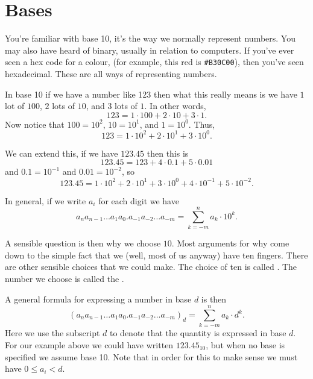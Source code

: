 \documentclass[fleqn]{LectureClass/LectureClass}
\begin{document}
    \section{Bases}
    You're familiar with base 10, it's the way we normally represent numbers.
    You may also have heard of binary, usually in relation to computers.
    If you've ever seen a hex code for a colour, (for example, \textcolor{glasgowPillarbox}{this red is \texttt{\#B30C00}}), then you've seen hexadecimal.
    These are all ways of representing numbers.
    
    In base 10 if we have a number like 123 then what this really means is we have \(1\) lot of \(100\), \(2\) lots of \(10\), and \(3\) lots of \(1\).
    In other words,
    \begin{equation}
        123 = 1 \cdot 100 + 2 \cdot 10 + 3 \cdot 1.
    \end{equation}
    Now notice that \(100 = 10^2\), \(10 = 10^1\), and \(1 = 10^0\).
    Thus,
    \begin{equation}
        123 = 1 \cdot 10^2 + 2 \cdot 10^1 + 3 \cdot 10^0.
    \end{equation}
    
    We can extend this, if we have \(123.45\) then this is
    \begin{equation}
        123.45 = 123 + 4 \cdot 0.1 + 5 \cdot 0.01
    \end{equation}
    and \(0.1 = 10^{-1}\) and \(0.01 = 10^{-2}\), so
    \begin{equation}
        123.45 = 1 \cdot 10^2 + 2 \cdot 10^1 + 3 \cdot 10^0 + 4 \cdot 10^{-1} + 5 \cdot 10^{-2}.
    \end{equation}
    
    In general, if we write \(a_i\) for each digit we have
    \begin{equation}
        a_n a_{n-1} \dotso a_1 a_0 . a_{-1} a_{-2} \dotso a_{-m} = \sum_{k = -m}^n a_k \cdot 10^k.
    \end{equation}
    
    A sensible question is then why we choose \(10\).
    Most arguments for why come down to the simple fact that we (well, most of us anyway) have ten fingers.
    There are other sensible choices that we could make.
    The choice of ten is called .
    The number we choose is called the .
    
    A general formula for expressing a number in base \(d\) is then
    \begin{equation}
        (a_n a_{n-1} \dotso a_1 a_0 . a_{-1} a_{-2} \dotso a_{-m})_d = \sum_{k = -m}^n a_k \cdot d^k.
    \end{equation}
    Here we use the subscript \(d\) to denote that the quantity is expressed in base \(d\).
    For our example above we could have written \(123.45_{10}\), but when no base is specified we assume base 10.
    Note that in order for this to make sense we must have \(0 \le a_i < d\).
    
\end{document}
